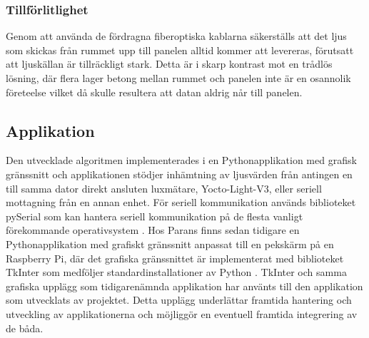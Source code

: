         \subsubsection{Tillförlitlighet} %
        \label{sub:tillf_rlitlighet}
            Genom att använda de fördragna fiberoptiska kablarna säkerställs att det ljus som skickas från rummet upp till panelen alltid kommer att levereras, förutsatt att ljuskällan är tillräckligt stark. Detta är i skarp kontrast mot en trådlös lösning, där flera lager betong mellan rummet och panelen inte är en osannolik företeelse vilket då skulle resultera att datan aldrig når till panelen.

    \subsection{Applikation} %
    \label{sub:applikation}
        Den utvecklade algoritmen implementerades i en Pythonapplikation med grafisk gränssnitt och applikationen stödjer inhämtning av ljusvärden från antingen en till samma dator direkt ansluten luxmätare, Yocto-Light-V3, eller seriell mottagning från en annan enhet. För seriell kommunikation används biblioteket pySerial som kan hantera seriell kommunikation på de flesta vanligt förekommande operativsystem \cite{pyserial}. Hos Parans finns sedan tidigare en Pythonapplikation med grafiskt gränssnitt anpassat till en pekskärm på en Raspberry Pi, där det grafiska gränssnittet är implementerat med biblioteket TkInter som medföljer standardinstallationer av Python \cite{solarremote}. TkInter och samma grafiska upplägg som tidigarenämnda applikation har använts till den applikation som utvecklats av projektet. Detta upplägg underlättar framtida hantering och utveckling av applikationerna och möjliggör en eventuell framtida integrering av de båda.

